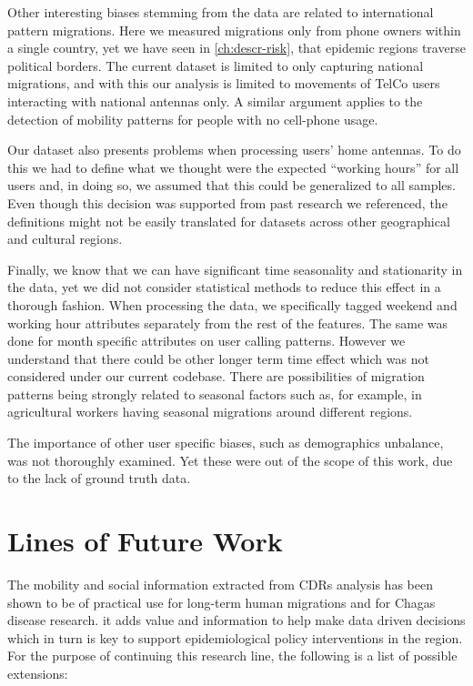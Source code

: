 Other interesting biases stemming from the data are related to international pattern migrations.
Here we measured migrations only from phone owners within a single country, yet we have seen in \cref{ch:descr-risk}, that  epidemic regions traverse political borders.
The current dataset is limited to only capturing national migrations, and with this our analysis is limited to movements of TelCo users interacting with national antennas only.
A similar argument applies to the detection of mobility patterns for people with no cell-phone usage.

Our dataset also presents problems when processing users' home antennas.
To do this we had to define what we thought were the expected ``working hours'' for all users and, in doing so, we assumed that this could be generalized to all samples. %
Even though this decision was supported from past research we referenced, the definitions might not be easily translated for datasets across other geographical and cultural regions.


Finally, we know that we can have significant time seasonality and stationarity in the data, yet we did not consider statistical methods to reduce this effect in a thorough fashion. %
When processing the data, we specifically tagged weekend and working hour attributes separately from the rest of the features.
The same was done for month specific attributes on user calling patterns.
However we understand that there could be other longer term time effect which was not considered under our current codebase. %
There are possibilities of migration patterns being strongly related to seasonal factors such as, for example, in agricultural workers having seasonal migrations around different regions.%

The importance of other user specific biases, such as demographics unbalance, was not thoroughly examined.
Yet these were out of the scope of this work, due to the lack of ground truth data.


\section{ Lines of Future Work }


The mobility and social information extracted from CDRs analysis has been shown to be of practical use for long-term human migrations and for Chagas disease research.
it adds value and information to help make data driven decisions which in turn is key to support epidemiological policy interventions in the region.
For the purpose of continuing this research line, the following is a list of possible extensions:

